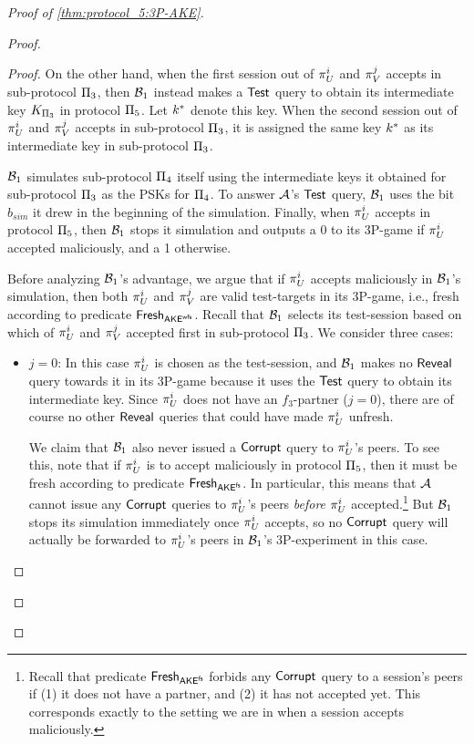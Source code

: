 \begin{proof}[Proof of \cref{thm:protocol_5:3P-AKE}]
\begin{proof}
\begin{proof}
On the other hand,
when the first session out of $\oracle[U][i]$ and $\oracle[V][j]$ accepts in sub-protocol $\protocol_3$,
then $\A[B]_1$ instead makes a $\Test$ query to obtain its intermediate key $\KDkey$ in protocol $\protocol_5$.
Let $\key^*$ denote this key.
When the second session out of $\oracle[U][i]$ and $\oracle[V][j]$ accepts in sub-protocol $\protocol_3$, 
it is assigned the same key $\key^*$ as its intermediate key in sub-protocol $\protocol_3$. 


$\A[B]_1$ simulates sub-protocol $\protocol_4$ itself using the intermediate keys it obtained for sub-protocol $\protocol_3$ as the PSKs for $\protocol_4$.
To answer $\A$'s $\Test$ query,
$\A[B]_1$ uses the bit $b_{sim}$ it drew in the beginning of the simulation.
Finally, 
when $\oracle[U][i]$ accepts in protocol $\protocol_5$,
then $\A[B]_1$ stops it simulation and outputs a 0 to its 3P-\akewfstext game if $\oracle[U][i]$ accepted maliciously,
and a 1 otherwise.
\smallskip

Before analyzing $\A[B]_1$'s advantage,
we argue that if $\oracle[U][i]$ accepts maliciously in $\A[B]_1$'s simulation,
then both $\oracle[U][i]$ and $\oracle[V][j]$ are valid  test-targets in its 3P-\akewfstext game,
i.e., fresh according to predicate $\fresh_{\akewfs}$.
Recall that $\A[B]_1$ selects its test-session based on which of $\oracle[U][i]$ and $\oracle[V][j]$  accepted first in sub-protocol $\protocol_3$.
We consider three cases: 
\begin{itemize}

	\item \emph{$j = 0$}:
	In this case $\oracle[U][i]$ is chosen as the test-session,
	and $\A[B]_1$ makes no $\Reveal$ query towards it in its 3P-\akewfstext game
	because it uses the $\Test$ query to obtain its intermediate key.
	Since $\oracle[U][i]$ does not have an $f_3$-partner ($j = 0$),
	there are of course no other $\Reveal$ queries that could have made $\oracle[U][i]$ unfresh.
	
	We claim that $\A[B]_1$ also never issued a $\Corrupt$ query to $\oracle[U][i]$'s peers.
	To see this,
	note that if $\oracle[U][i]$ is to accept maliciously in protocol $\protocol_5$,
	then it must be fresh according to predicate $\fresh_{\akefs}$.
	In particular,
	this means that $\A$ cannot issue any $\Corrupt$ queries to $\oracle[U][i]$'s peers \emph{before} $\oracle[U][i]$ accepted.\footnote{Recall 
	that predicate $\fresh_{\akefs}$ forbids any $\Corrupt$ query to a session's peers if (1) it does not have a partner, and (2) it has not accepted yet. 
	This corresponds exactly to the setting we are in when a session accepts maliciously.
	}  
	But
	$\A[B]_1$ stops its simulation immediately once $\oracle[U][i]$ accepts,
	so no $\Corrupt$ query will actually be forwarded to $\oracle[U][i]$'s peers  in $\A[B]_1$'s 3P-\akewfstext experiment in this case.


\end{itemize}
\end{proof}
\end{proof}
\end{proof}
